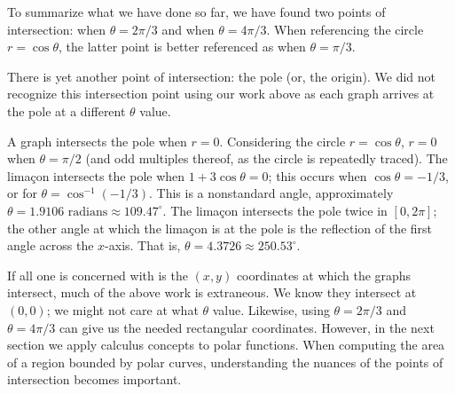 {To summarize what we have done so far, we have found two points of intersection: when $\theta=2\pi/3$ and when $\theta=4\pi/3$. When referencing the circle $r=\cos \theta$, the latter point is better referenced as when $\theta=\pi/3$.

There is yet another point of intersection: the pole (or, the origin). We did not recognize this intersection point using our work above as each graph arrives at the pole at a different $\theta$ value.

A graph intersects the pole when $r=0$. Considering the circle $r=\cos\theta$, $r=0$ when $\theta = \pi/2$ (and odd multiples thereof, as the circle is repeatedly traced). The lima\c con intersects the pole when $1+3\cos\theta =0$; this occurs when $\cos \theta = -1/3$, or for $\theta = \cos^{-1}(-1/3)$. This is a nonstandard angle, approximately $\theta = 1.9106\text{ radians} \approx 109.47^\circ$. The lima\c con intersects the pole twice in $[0,2\pi]$; the other angle at which the lima\c con is at the pole is the reflection of the first angle across the $x$-axis. That is, $\theta = 4.3726 \approx 250.53^\circ.$}

If all one is concerned with is the $(x,y)$ coordinates at which the graphs intersect, much of the above work is extraneous. We know they intersect at $(0,0)$; we might not care at what $\theta$ value. Likewise, using $\theta =2\pi/3$ and $\theta=4\pi/3$ can give us the needed rectangular coordinates. However, in the next section we apply calculus concepts to polar functions. When computing the area of a region bounded by polar curves, understanding the nuances of the points of intersection becomes important.

